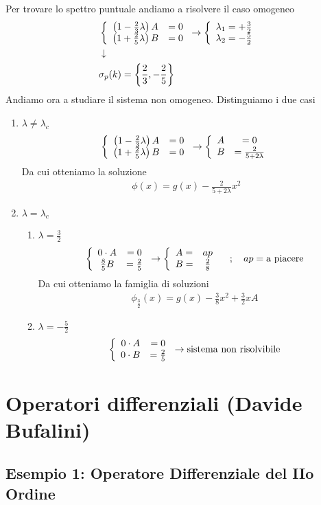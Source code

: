 Per trovare lo spettro puntuale andiamo a risolvere il caso omogeneo
\begin{align}
	&\left\{ \begin{array}{cc} \left( 1 - \frac{2}{3}\lambda \right) A &=0\\ \left( 1 + \frac{2}{5}\lambda \right) B &= 0 \end{array} \right. \to \left\{ \begin{array}{cc} \lambda_1 = +\frac{3}{2}\\ \lambda_2 = -\frac{5}{2} \end{array} \right. \\ &\downarrow \nonumber \\
	&\sigma_p(k) = \left\{ \frac{2}{3} , -\frac{2}{5} \right\}
\end{align}
Andiamo ora a studiare il sistema non omogeneo. Distinguiamo i due casi
\begin{enumerate}
	\item $\lambda \neq \lambda_c$
	\begin{align}
		\left\{ \begin{array}{cc} \left( 1 - \frac{2}{3}\lambda \right) A &=0\\ \left( 1 + \frac{2}{5}\lambda \right) B &= 0 \end{array} \right. \to \left\{ \begin{array}{cc} A &=0\\ B &= \frac{2}{5+2\lambda} \end{array} \right.
	\end{align}
	Da cui otteniamo la soluzione
	\begin{align}
		\phi(x) = g(x) - \frac{2}{5+2\lambda} x^2
	\end{align}
	\newpage
	\item $\lambda = \lambda_c$
	\begin{enumerate}
		\item $\lambda=\frac{3}{2}$
		\begin{align}
			\left\{ \begin{array}{cc} 0\cdot A &=0\\ \frac{8}{5} B &= \frac{2}{5} \end{array} \right. \to \left\{ \begin{array}{cc} A = &ap\\ B = &\frac{2}{8} \end{array} \right. \quad ; \quad ap = \text{a piacere}
		\end{align}
		Da cui otteniamo la famiglia di soluzioni
		\begin{align}
			\phi_{\frac{3}{2}}(x) = g(x) - \frac{3}{8} x^2 + \frac{3}{2}xA 
		\end{align}
		\item $\lambda=-\frac{5}{2}$
		\begin{align}
			\left\{ \begin{array}{cc} 0\cdot A &=0\\ 0\cdot B &= \frac{2}{5} \end{array} \right. \to \text{sistema non risolvibile}
		\end{align}
	
	\end{enumerate}
\end{enumerate}

\newpage

\section{Operatori differenziali (Davide Bufalini)}

\subsection{Esempio 1: Operatore Differenziale del IIo Ordine}

